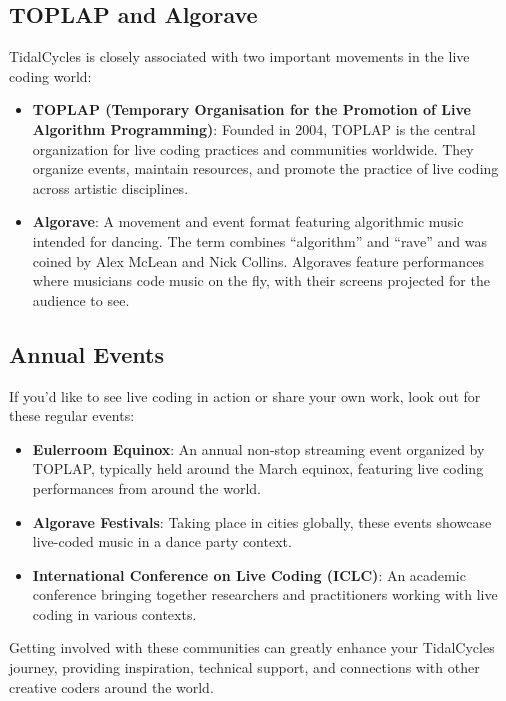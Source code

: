 \documentclass[11pt,a4paper]{article}
\begin{document}
\subsection{TOPLAP and Algorave}

TidalCycles is closely associated with two important movements in the live coding world:

\begin{itemize}
    \item \textbf{TOPLAP (Temporary Organisation for the Promotion of Live Algorithm Programming)}: Founded in 2004, TOPLAP is the central organization for live coding practices and communities worldwide. They organize events, maintain resources, and promote the practice of live coding across artistic disciplines.

    \item \textbf{Algorave}: A movement and event format featuring algorithmic music intended for dancing. The term combines ``algorithm'' and ``rave'' and was coined by Alex McLean and Nick Collins. Algoraves feature performances where musicians code music on the fly, with their screens projected for the audience to see.
\end{itemize}

\subsection{Annual Events}

If you'd like to see live coding in action or share your own work, look out for these regular events:

\begin{itemize}
    \item \textbf{Eulerroom Equinox}: An annual non-stop streaming event organized by TOPLAP, typically held around the March equinox, featuring live coding performances from around the world.

    \item \textbf{Algorave Festivals}: Taking place in cities globally, these events showcase live-coded music in a dance party context.

    \item \textbf{International Conference on Live Coding (ICLC)}: An academic conference bringing together researchers and practitioners working with live coding in various contexts.
\end{itemize}

Getting involved with these communities can greatly enhance your TidalCycles journey, providing inspiration, technical support, and connections with other creative coders around the world.
\end{document}

